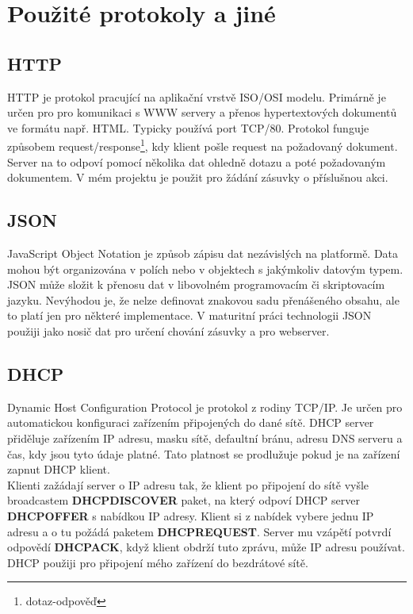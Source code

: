 \documentclass[a4paper, 12pt]{report}
\begin{document}
    \section{Použité protokoly a jiné}

    \subsection{HTTP}
    HTTP je protokol pracující na aplikační vrstvě ISO/OSI modelu.
    Primárně je určen pro pro komunikaci s WWW servery a přenos hypertextových dokumentů ve formátu např. HTML\@.
    Typicky používá port TCP/80.
    Protokol funguje způsobem request/response\footnote{dotaz-odpověď}, kdy klient pošle request na požadovaný dokument.
    Server na to odpoví pomocí několika dat ohledně dotazu a poté požadovaným dokumentem.
    V mém projektu je použit pro žádání zásuvky o příslušnou akci.

    \subsection{JSON}
    JavaScript Object Notation je způsob zápisu dat nezávislých na platformě.
    Data mohou být organizována v polích nebo v objektech s jakýmkoliv datovým typem.
    JSON může složit k přenosu dat v libovolném programovacím či skriptovacím jazyku.
    Nevýhodou je, že nelze definovat znakovou sadu přenášeného obsahu, ale to platí jen pro některé implementace.
    V maturitní práci technologii JSON použiji jako nosič dat pro určení chování zásuvky a pro webserver.

    \subsection{DHCP}
    Dynamic Host Configuration Protocol je protokol z rodiny TCP/IP. Je určen pro automatickou konfiguraci zařízením připojených do dané sítě.
    DHCP server přiděluje zařízením IP adresu, masku sítě, defaultní bránu, adresu DNS serveru a čas, kdy jsou tyto údaje platné.
    Tato platnost se prodlužuje pokud je na zařízení zapnut DHCP klient.\\
    Klienti zažádají server o IP adresu tak, že klient po připojení do sítě vyšle broadcastem \textbf{DHCPDISCOVER} paket, na který odpoví DHCP server \textbf{DHCPOFFER} s nabídkou IP adresy.
    Klient si z nabídek vybere jednu IP adresu a o tu požádá paketem \textbf{DHCPREQUEST}.
    Server mu vzápětí potvrdí odpovědí \textbf{DHCPACK}, když klient obdrží tuto zprávu, může IP adresu používat.
    DHCP použiji pro připojení mého zařízení do bezdrátové sítě.
\end{document}
